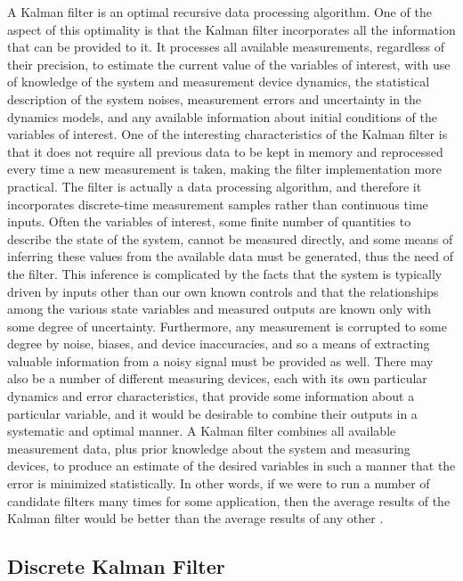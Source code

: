 A Kalman filter is an optimal recursive data processing algorithm. One of the aspect of this optimality is that the Kalman filter incorporates all the information that can be provided to it. It processes all available measurements, regardless of their precision, to estimate the current value of the variables of interest, with use of knowledge of the system and measurement device dynamics, the statistical description of the system noises, measurement errors and uncertainty in the dynamics models, and any available information about initial conditions of the variables of interest. One of the interesting characteristics of the Kalman filter is that it does not require all previous data to be kept in memory and reprocessed every time a new measurement is taken, making the filter implementation more practical. The filter is actually a data processing algorithm, and therefore it incorporates discrete-time measurement samples rather than continuous time inputs. Often the variables of interest, some finite number of quantities to describe the state of the system, cannot be measured directly, and some means of inferring these values from the available data must be generated, thus the need of the filter. This inference is complicated by the facts that the system is typically driven by inputs other than our own known controls and that the relationships among the various state variables and measured outputs are known only with some degree of uncertainty. Furthermore, any measurement is corrupted to some degree by noise, biases, and device inaccuracies, and so a means of extracting valuable information from a noisy signal must be provided as well. There may also be a number of different measuring devices, each with its own particular dynamics and error characteristics, that provide some information about a particular variable, and it would be desirable to combine their outputs in a systematic and optimal manner. A Kalman filter combines all available measurement data, plus prior knowledge about the system and measuring devices, to produce an estimate of the desired variables in such a manner that the error is minimized statistically. In other words, if we were to run a number of candidate filters many times for some application, then the average results of the Kalman filter would be better than the average results of any other \cite{Maybeck1979}.

\subsection{Discrete Kalman Filter}

